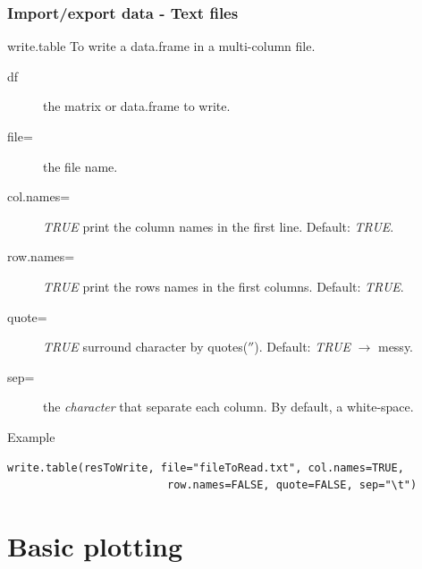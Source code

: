 \documentclass[10pt]{beamer}
\newenvironment{xframe}[2][]
  {\begin{frame}[fragile,environment=xframe,#1]
  \frametitle{#2}}
  {\end{frame}}
\begin{document}
\begin{xframe}[shrink=10]{Import/export data - Text files}
  \begin{block}{{\sf write.table}}
    To write a {\sf data.frame} in a multi-column file.
    \begin{description}
    \item[df] the {\sf matrix} or {\sf data.frame} to write.
    \item[file=] the file name.
    \item[col.names=] {\it TRUE} print the column names in the first line. Default: {\it TRUE}.
    \item[row.names=] {\it TRUE} print the rows names in the first columns. Default: {\it TRUE}.
    \item[quote=] {\it TRUE} surround {\sf character} by quotes($''$). Default: {\it TRUE} $\rightarrow$ messy. 
    \item[sep=] the {\it character} that separate each column. By default, a white-space.
    \end{description}
  \end{block}
  \begin{exampleblock}{Example}
\begin{verbatim}
write.table(resToWrite, file="fileToRead.txt", col.names=TRUE, 
                         row.names=FALSE, quote=FALSE, sep="\t")
\end{verbatim}  
  \end{exampleblock}
\end{xframe}

\section{Basic plotting}
\end{document}

